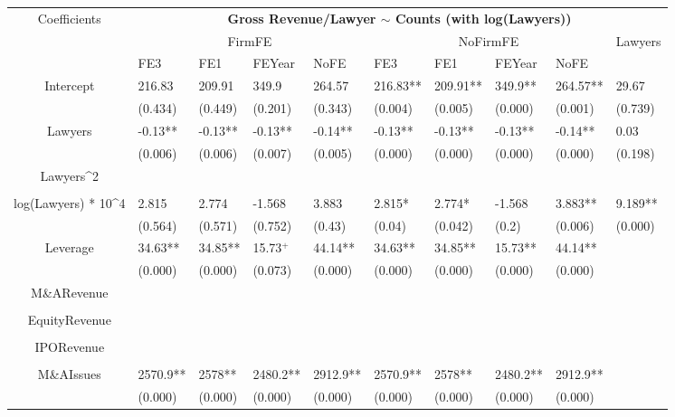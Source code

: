 \documentclass{article}
\begin{document}
\begin{table}[H]
\centering
\begin{tabular}{|clllllllll|}
\hline
\multirow{3}{*}{Coefficients} & \multicolumn{9}{c|}{\textbf{Gross Revenue/Lawyer $\sim$ Counts (with log(Lawyers))}} \\
\cline{2-10}
& \multicolumn{4}{c}{FirmFE} & \multicolumn{4}{c}{NoFirmFE} & \multirow{2}{*}{Lawyers} \\
\cline{2-9}
& FE3 & FE1 & FEYear & NoFE & FE3 & FE1 & FEYear & NoFE &  \\
\hline
 
Intercept & 216.83 & 209.91 & 349.9 & 264.57 & 216.83** & 209.91** & 349.9** & 264.57** & 29.67 \\ 
   & (0.434) & (0.449) & (0.201) & (0.343) & (0.004) & (0.005) & (0.000) & (0.001) & (0.739) \\ 
  Lawyers & -0.13** & -0.13** & -0.13** & -0.14** & -0.13** & -0.13** & -0.13** & -0.14** & 0.03 \\ 
   & (0.006) & (0.006) & (0.007) & (0.005) & (0.000) & (0.000) & (0.000) & (0.000) & (0.198) \\ 
  Lawyers^2 &  &  &  &  &  &  &  &  &  \\ 
   &  &  &  &  &  &  &  &  &  \\ 
  log(Lawyers) * 10^4 & 2.815 & 2.774 & -1.568 & 3.883 & 2.815* & 2.774* & -1.568 & 3.883** & 9.189** \\ 
   & (0.564) & (0.571) & (0.752) & (0.43) & (0.04) & (0.042) & (0.2) & (0.006) & (0.000) \\ 
  Leverage & 34.63** & 34.85** & 15.73$^{+}$ & 44.14** & 34.63** & 34.85** & 15.73** & 44.14** &  \\ 
   & (0.000) & (0.000) & (0.073) & (0.000) & (0.000) & (0.000) & (0.000) & (0.000) &  \\ 
  M\&ARevenue &  &  &  &  &  &  &  &  &  \\ 
   &  &  &  &  &  &  &  &  &  \\ 
  EquityRevenue &  &  &  &  &  &  &  &  &  \\ 
   &  &  &  &  &  &  &  &  &  \\ 
  IPORevenue &  &  &  &  &  &  &  &  &  \\ 
   &  &  &  &  &  &  &  &  &  \\ 
  M\&AIssues & 2570.9** & 2578** & 2480.2** & 2912.9** & 2570.9** & 2578** & 2480.2** & 2912.9** &  \\ 
   & (0.000) & (0.000) & (0.000) & (0.000) & (0.000) & (0.000) & (0.000) & (0.000) &  \\ 

\end{tabular}
\end{table}
\end{document}
